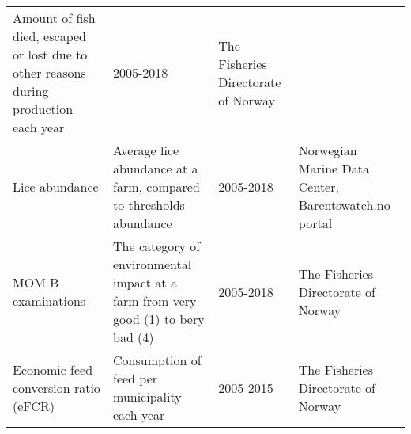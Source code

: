\documentclass[
]{book}
\begin{document}
\begin{longtable}[]{@{}llll@{}}
\begin{minipage}[t]{0.22\columnwidth}
Amount of fish died, escaped or lost due to other reasons during production each year\strut
\end{minipage} & \begin{minipage}[t]{0.25\columnwidth}\raggedright
2005-2018\strut
\end{minipage} & \begin{minipage}[t]{0.18\columnwidth}\raggedright
The Fisheries Directorate of Norway\strut
\end{minipage}\tabularnewline
\begin{minipage}[t]{0.23\columnwidth}\raggedright
Lice abundance\strut
\end{minipage} & \begin{minipage}[t]{0.22\columnwidth}\raggedright
Average lice abundance at a farm, compared to thresholds abundance\strut
\end{minipage} & \begin{minipage}[t]{0.25\columnwidth}\raggedright
2005-2018\strut
\end{minipage} & \begin{minipage}[t]{0.18\columnwidth}\raggedright
Norwegian Marine Data Center, Barentswatch.no portal\strut
\end{minipage}\tabularnewline
\begin{minipage}[t]{0.23\columnwidth}\raggedright
MOM B examinations\strut
\end{minipage} & \begin{minipage}[t]{0.22\columnwidth}\raggedright
The category of environmental impact at a farm from very good (1) to bery bad (4)\strut
\end{minipage} & \begin{minipage}[t]{0.25\columnwidth}\raggedright
2005-2018\strut
\end{minipage} & \begin{minipage}[t]{0.18\columnwidth}\raggedright
The Fisheries Directorate of Norway\strut
\end{minipage}\tabularnewline
\begin{minipage}[t]{0.23\columnwidth}\raggedright
Economic feed conversion ratio (eFCR)\strut
\end{minipage} & \begin{minipage}[t]{0.22\columnwidth}\raggedright
Consumption of feed per municipality each year\strut
\end{minipage} & \begin{minipage}[t]{0.25\columnwidth}\raggedright
2005-2015\strut
\end{minipage} & \begin{minipage}[t]{0.18\columnwidth}\raggedright
The Fisheries Directorate of Norway\strut
\end{minipage}\tabularnewline
\bottomrule
\end{longtable}
\end{document}
